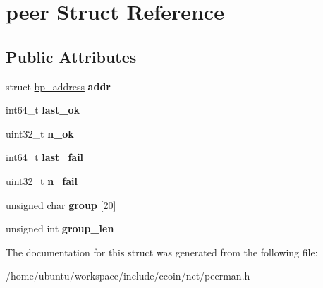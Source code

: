 \hypertarget{structpeer}{\section{peer Struct Reference}
\label{structpeer}
}
\subsection*{Public Attributes}
\begin{DoxyCompactItemize}
\item 
\hypertarget{structpeer_a6f2c38131ee9de376a86f2ca69919bcb}{struct \hyperlink{structbp__address}{bp\-\_\-address} {\bfseries addr}}\label{structpeer_a6f2c38131ee9de376a86f2ca69919bcb}

\item 
\hypertarget{structpeer_ad11e0a077b509e6e2681a8f7cb088a31}{int64\-\_\-t {\bfseries last\-\_\-ok}}\label{structpeer_ad11e0a077b509e6e2681a8f7cb088a31}

\item 
\hypertarget{structpeer_a22a6421bb65bd59948a76e960f7ad2fb}{uint32\-\_\-t {\bfseries n\-\_\-ok}}\label{structpeer_a22a6421bb65bd59948a76e960f7ad2fb}

\item 
\hypertarget{structpeer_aeae397fd5620c86fc76455fc0b936bc6}{int64\-\_\-t {\bfseries last\-\_\-fail}}\label{structpeer_aeae397fd5620c86fc76455fc0b936bc6}

\item 
\hypertarget{structpeer_aa12d794dac2147efb0e3bfd0d4c6cea9}{uint32\-\_\-t {\bfseries n\-\_\-fail}}\label{structpeer_aa12d794dac2147efb0e3bfd0d4c6cea9}

\item 
\hypertarget{structpeer_a361e01195f6a090b02a3d863ff5a6dc0}{unsigned char {\bfseries group} \mbox{[}20\mbox{]}}\label{structpeer_a361e01195f6a090b02a3d863ff5a6dc0}

\item 
\hypertarget{structpeer_aaeec3fbd808ae625f906536ae2236d9a}{unsigned int {\bfseries group\-\_\-len}}\label{structpeer_aaeec3fbd808ae625f906536ae2236d9a}

\end{DoxyCompactItemize}


The documentation for this struct was generated from the following file\-:\begin{DoxyCompactItemize}
\item 
/home/ubuntu/workspace/include/ccoin/net/peerman.\-h\end{DoxyCompactItemize}
